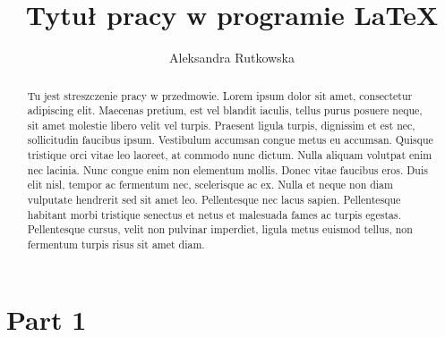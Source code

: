 \documentclass[12pt,a4paper]{article}
\title{Tytuł pracy w programie \LaTeX}
\author{Aleksandra Rutkowska}
\begin{document}
	\maketitle
	
	\begin{abstract}
		Tu jest streszczenie pracy w przedmowie. Lorem ipsum dolor sit amet, consectetur adipiscing elit. Maecenas pretium, est vel blandit iaculis, tellus purus posuere neque, sit amet molestie libero velit vel turpis. Praesent ligula turpis, dignissim et est nec, sollicitudin faucibus ipsum. Vestibulum accumsan congue metus eu accumsan. Quisque tristique orci vitae leo laoreet, at commodo nunc dictum. Nulla aliquam volutpat enim nec lacinia. Nunc congue enim non elementum mollis. Donec vitae faucibus eros. Duis elit nisl, tempor ac fermentum nec, scelerisque ac ex. Nulla et neque non diam vulputate hendrerit sed sit amet leo. Pellentesque nec lacus sapien. Pellentesque habitant morbi tristique senectus et netus et malesuada fames ac turpis egestas. Pellentesque cursus, velit non pulvinar imperdiet, ligula metus euismod tellus, non fermentum turpis risus sit amet diam.
	\end{abstract}
	
	\newpage
	
	\tableofcontents
	
	\newpage
	
	\part {Part 1}
\end{document}
